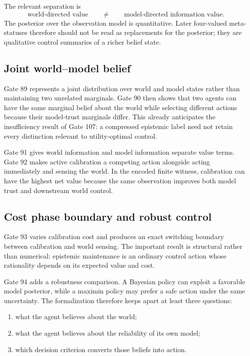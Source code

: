 The relevant separation is
\[
\text{world-directed value}
\qquad\neq\qquad
\text{model-directed information value}.
\]
The posterior over the observation model is quantitative. Later four-valued meta-statuses therefore should not be read as replacements for the posterior; they are qualitative control summaries of a richer belief state.

\subsection{Joint world--model belief}

Gate 89 represents a joint distribution over world and model states rather than maintaining two unrelated marginals. Gate 90 then shows that two agents can have the same marginal belief about the world while selecting different actions because their model-trust marginals differ. This already anticipates the insufficiency result of Gate 107: a compressed epistemic label need not retain every distinction relevant to utility-optimal control.

Gate 91 gives world information and model information separate value terms. Gate 92 makes active calibration a competing action alongside acting immediately and sensing the world. In the encoded finite witness, calibration can have the highest net value because the same observation improves both model trust and downstream world control.

\subsection{Cost phase boundary and robust control}

Gate 93 varies calibration cost and produces an exact switching boundary between calibration and world sensing. The important result is structural rather than numerical: epistemic maintenance is an ordinary control action whose rationality depends on its expected value and cost.

Gate 94 adds a robustness comparison. A Bayesian policy can exploit a favorable model posterior, while a maximin policy may prefer a safe action under the same uncertainty. The formalization therefore keeps apart at least three questions:

\begin{enumerate}
  \item what the agent believes about the world;
  \item what the agent believes about the reliability of its own model;
  \item which decision criterion converts those beliefs into action.
\end{enumerate}

